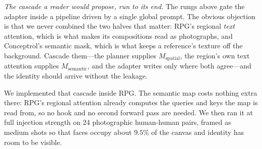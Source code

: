 \documentclass[10pt,twocolumn,letterpaper]{article}
\begin{document}
\noindent\textit{The cascade a reader would propose, run to its end.}
The rungs above gate the adapter inside a pipeline driven by a single global
prompt.  The obvious objection is that we never combined the two halves that
matter: RPG's regional \emph{text} attention, which is what makes its
compositions read as photographs, and Conceptrol's semantic mask, which is
what keeps a reference's texture off the background.  Cascade them---the
planner supplies $M_{\mathrm{spatial}}$, the region's own text attention
supplies $M_{\mathrm{semantic}}$, and the adapter writes only where both
agree---and the identity should arrive without the leakage.

We implemented that cascade inside RPG.  The semantic map costs nothing extra
there: RPG's regional attention already computes the queries and keys the map
is read from, so no hook and no second forward pass are needed.  We then ran
it at full injection strength on 24 photographic human-human pairs, framed as
medium shots so that faces occupy about $9.5\%$ of the canvas and identity has
room to be visible.

\begin{table}[htbp]
\centering
\caption{%
  \textbf{The RPG cascade delivers RPG's pictures and none of the identity.}
  ArcFace on detected faces, so the score does not move with framing; $0$ is
  chance.  Text-only RPG is the floor.  Adding the adapter, with or without the
  semantic mask, and at five times the default strength, never leaves it.%
}
\label{tab:cascade}
\end{table}
\end{document}

